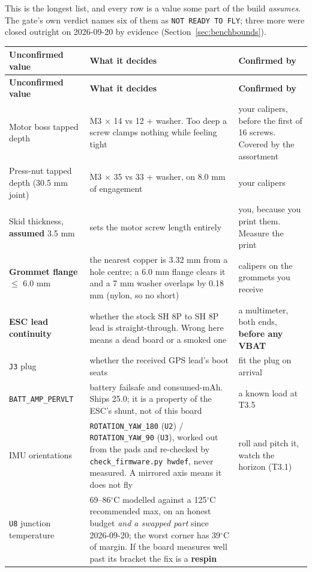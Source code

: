 \documentclass[11pt,a4paper]{article}
\newcommand{\file}[1]{\texttt{\small #1}}
\newcommand{\degC}{$^\circ$C}
\begin{document}
This is the longest list, and every row is a value some part of the build \emph{assumes}.
The gate's own verdict names six of them as \file{NOT READY TO FLY}; three more were closed
outright on 2026-09-20 by evidence (Section~\ref{sec:benchbounds}).

\begin{longtable}{@{}p{}p{}p{}@{}}
\toprule
\textbf{Unconfirmed value} & \textbf{What it decides} & \textbf{Confirmed by} \\
\midrule
\endfirsthead
\toprule
\textbf{Unconfirmed value} & \textbf{What it decides} & \textbf{Confirmed by} \\
\midrule
\endhead
\bottomrule
\endfoot
Motor boss tapped depth & M3 $\times$ 14 vs 12 + washer. Too deep a screw clamps nothing while
feeling tight & your calipers, before the first of 16 screws. Covered by the assortment \\
Press-nut tapped depth (30.5 mm joint) & M3 $\times$ 35 vs 33 + washer, on 8.0 mm of
engagement & your calipers \\
Skid thickness, \textbf{assumed} 3.5 mm & sets the motor screw length entirely & you, because
you print them. Measure the print \\
\textbf{Grommet flange} $\leq$ 6.0 mm & the nearest copper is 3.32 mm from a hole centre; a
6.0 mm flange clears it and a 7 mm washer overlaps by 0.18 mm (nylon, so no short) & calipers
on the grommets you receive \\
\textbf{ESC lead continuity} & whether the stock SH 8P to SH 8P lead is straight-through. Wrong here
means a dead board or a smoked one & a multimeter, both ends, \textbf{before any VBAT} \\
\file{J3} plug & whether the received GPS lead's boot seats & fit the plug on arrival \\
\file{BATT\_AMP\_PERVLT} & battery failsafe and consumed-mAh. Ships 25.0; it is a property of
the ESC's shunt, not of this board & a known load at T3.5 \\
IMU orientations & \file{ROTATION\_YAW\_180} (\file{U2}) / \file{ROTATION\_YAW\_90} (\file{U3}), worked out from the pads and
re-checked by \file{check\_firmware.py hwdef}, never measured. A mirrored axis means it does not fly & roll and pitch it, watch the horizon (T3.1) \\
\file{U8} junction temperature & 69--86\degC{} modelled against a 125\degC{} recommended
max, on an honest budget \emph{and a swapped part} since 2026-09-20; the worst corner has
39\degC{} of margin. If the board measures well past its bracket the fix is a \textbf{respin}

\end{longtable}
\end{document}
